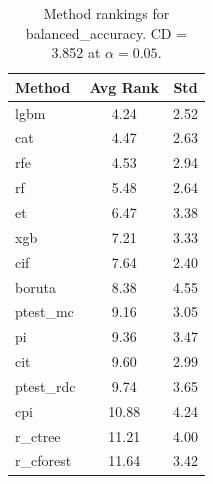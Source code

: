 \begin{table}[h]
\centering
\caption{Method rankings for balanced_accuracy. CD = 3.852 at $\alpha=0.05$.}
\label{tab:ranks_balanced_accuracy}
\begin{tabular}{lcc}
\toprule
Method & Avg Rank & Std \\
\midrule
lgbm & 4.24 & 2.52 \\
cat & 4.47 & 2.63 \\
rfe & 4.53 & 2.94 \\
rf & 5.48 & 2.64 \\
et & 6.47 & 3.38 \\
xgb & 7.21 & 3.33 \\
cif & 7.64 & 2.40 \\
boruta & 8.38 & 4.55 \\
ptest_mc & 9.16 & 3.05 \\
pi & 9.36 & 3.47 \\
cit & 9.60 & 2.99 \\
ptest_rdc & 9.74 & 3.65 \\
cpi & 10.88 & 4.24 \\
r_ctree & 11.21 & 4.00 \\
r_cforest & 11.64 & 3.42 \\
\bottomrule
\end{tabular}
\end{table}